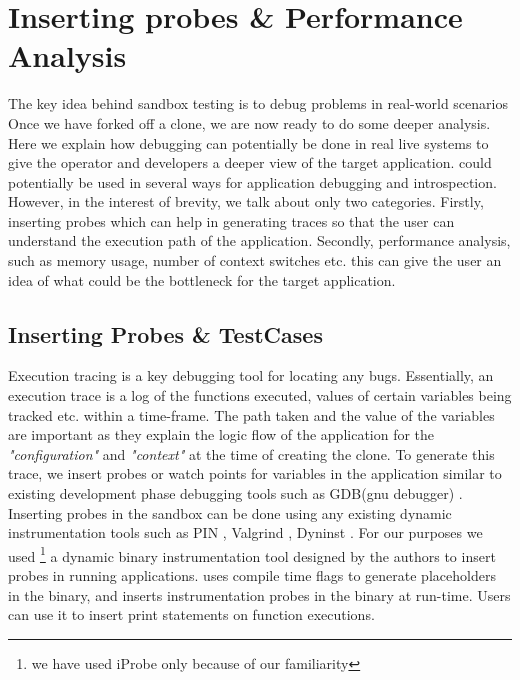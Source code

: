 \noindent\section{Inserting probes \& Performance Analysis}
\label{sec:trigger}

The key idea behind sandbox testing is to debug problems in real-world scenarios
Once we have forked off a clone, we are now ready to do some deeper analysis. 
Here we explain how debugging can potentially be done in real live systems to give the operator and developers a deeper view of the target application.
\parikshan could potentially be used in several ways for application debugging and introspection. 
However, in the interest of brevity, we talk about only two categories. 
Firstly, inserting probes which can help in generating traces so that the user can understand the execution path of the application.
Secondly, performance analysis, such as memory usage, number of context switches etc. this can give the user an idea of what could be the bottleneck for the target application.


\noindent\subsection{Inserting Probes \& TestCases}
\label{sec:unitTests}

Execution tracing is a key debugging tool for locating any bugs. 
Essentially, an execution trace is a log of the functions executed, values of certain variables being tracked etc. within a time-frame.
The path taken and the value of the variables are important as they explain the logic flow of the application for the \emph{"configuration"} and \emph{"context"} at the time of creating the clone.
To generate this trace, we insert probes or watch points for variables in the application similar to existing development phase debugging tools such as GDB(gnu debugger) \cite{gdb}.
Inserting probes in the sandbox can be done using any existing dynamic instrumentation tools  such as PIN \cite{pin}, Valgrind \cite{valgrind}, Dyninst \cite{dyninst}.
For our purposes we used \iprobe\footnote{we have used iProbe only because of our familiarity} \cite{iProbe} a dynamic binary instrumentation tool designed by the authors to insert probes in running applications. 
 \iprobe  uses compile time flags to generate placeholders in the binary, and inserts instrumentation probes in the binary at run-time.
Users can use it to insert print statements on function executions. 



